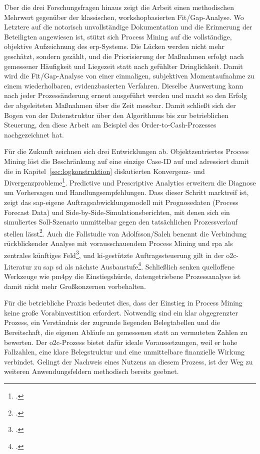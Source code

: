 Über die drei Forschungsfragen hinaus zeigt die Arbeit einen methodischen Mehrwert gegenüber der klassischen, workshopbasierten Fit/Gap-Analyse. Wo Letztere auf die notorisch unvollständige Dokumentation und die Erinnerung der Beteiligten angewiesen ist, stützt sich Process Mining auf die vollständige, objektive Aufzeichnung des \gls{erp}-Systems. Die Lücken werden nicht mehr geschätzt, sondern gezählt, und die Priorisierung der Maßnahmen erfolgt nach gemessener Häufigkeit und Liegezeit statt nach gefühlter Dringlichkeit. Damit wird die Fit/Gap-Analyse von einer einmaligen, subjektiven Momentaufnahme zu einem wiederholbaren, evidenzbasierten Verfahren. Dieselbe Auswertung kann nach jeder Prozessänderung erneut ausgeführt werden und macht so den Erfolg der abgeleiteten Maßnahmen über die Zeit messbar. Damit schließt sich der Bogen von der Datenstruktur über den Algorithmus bis zur betrieblichen Steuerung, den diese Arbeit am Beispiel des Order-to-Cash-Prozesses nachgezeichnet hat.

Für die Zukunft zeichnen sich drei Entwicklungen ab. Objektzentriertes Process Mining löst die Beschränkung auf eine einzige Case-ID auf und adressiert damit die in Kapitel~\ref{sec:logkonstruktion} diskutierten Konvergenz- und Divergenzprobleme\footcite[Vgl.][S.~3 ff.]{vanderaalst2019objectcentric}. Predictive und Prescriptive Analytics erweitern die Diagnose um Vorhersagen und Handlungsempfehlungen. Dass dieser Schritt marktreif ist, zeigt das \gls{sap}-eigene Auftragsabwicklungsmodell mit Prognosedaten (Process Forecast Data) und Side-by-Side-Simulationsberichten, mit denen sich ein simuliertes Soll-Szenario unmittelbar gegen den tatsächlichen Prozessverlauf stellen lässt\footcite[Vgl.][Abschnitt~3.1.16 und 3.4, S.~18 und 27--33]{sap2022samplecontent}. Auch die Fallstudie von Adolfsson/Saleh benennt die Verbindung rückblickender Analyse mit vorausschauendem Process Mining und \gls{rpa} als zentrales künftiges Feld\footcite[Vgl.][S.~73 f.]{adolfsson2026o2c}, und \gls{ki}-gestützte Auftragssteuerung gilt in der \gls{o2c}-Literatur zu \gls{sap} \gls{sd} als nächste Ausbaustufe\footcite[Vgl.][S.~111 f.]{nadukuru2024o2c}. Schließlich senken quelloffene Werkzeuge wie \gls{pm4py} die Einstiegshürde, datengetriebene Prozessanalyse ist damit nicht mehr Großkonzernen vorbehalten.

Für die betriebliche Praxis bedeutet dies, dass der Einstieg in Process Mining keine große Vorabinvestition erfordert. Notwendig sind ein klar abgegrenzter Prozess, ein Verständnis der zugrunde liegenden Belegtabellen und die Bereitschaft, die eigenen Abläufe an gemessenen statt an vermuteten Zahlen zu bewerten. Der \gls{o2c}-Prozess bietet dafür ideale Voraussetzungen, weil er hohe Fallzahlen, eine klare Belegstruktur und eine unmittelbare finanzielle Wirkung verbindet. Gelingt der Nachweis eines Nutzens an diesem Prozess, ist der Weg zu weiteren Anwendungsfeldern methodisch bereits geebnet.
